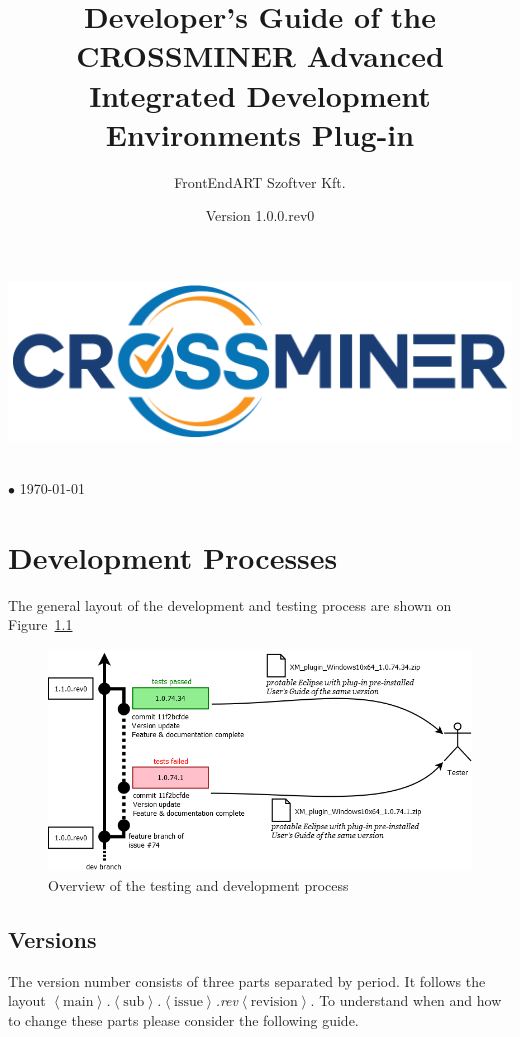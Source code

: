 \documentclass[11pt,a4paper]{book}
\author{FrontEndART Szoftver Kft.}
\title{Developer's Guide of the CROSSMINER Advanced Integrated Development Environments Plug-in}
\date{Version 1.0.0.rev0}
\makeatletter
\renewcommand{\maketitle}{
\vspace*{.1\textheight}
\begin{center}
	\includegraphics[width=.6\textwidth]{pic/CROSSMINER-logo-large.png}
\end{center}
\begin{center}
	\Huge\@title
\end{center}
\vfill
\begin{center}
	\large\@author\\\@date{} $\bullet$ \today
\end{center}
}
\newcommand{\placeholder}[1]{$\left\langle\text{#1}\right\rangle$}
\makeatother
\begin{document}
	
\begin{titlepage}
	\maketitle
\end{titlepage}

\chapter{Development Processes}

The general layout of the development and testing process are shown on Figure~\ref{fig:version}

\begin{figure}[h]
	\centering
	\includegraphics[width=\linewidth]{pic/version.png}
	\caption{Overview of the testing and development process}
	\label{fig:version}
\end{figure}


\section{Versions}
The version number consists of three parts separated by period. It follows the layout \emph{\placeholder{main}.\placeholder{sub}.\placeholder{issue}.rev\placeholder{revision}}. To understand when and how to change these parts please consider the following guide.
\end{document}
